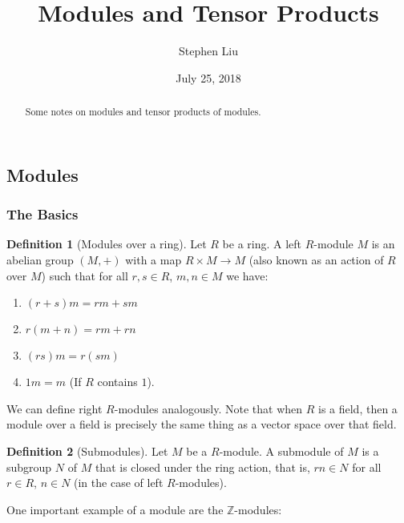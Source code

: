 \documentclass[11pt]{article}
\theoremstyle{definition}
\newtheorem*{defn}{Definition}
\theoremstyle{plain}
\theoremstyle{plain}
\theoremstyle{plain}
\theoremstyle{definition}
\begin{document}
\author{Stephen Liu}
\title{Modules and Tensor Products}
\date{July 25, 2018}

\maketitle

\begin{abstract}
Some notes on modules and tensor products of modules.
\end{abstract}

\subsection*{Modules}

\subsubsection*{The Basics}

\begin{defn}[Modules over a ring]
Let $R$ be a ring. A left $R$-module $M$ is an abelian group $(M, +)$ with a map $R \times M \to M$ (also known as an action of $R$ over $M$) such that for all $r, s \in R$, $m,n \in M$ we have:

\begin{enumerate}
\item $(r + s)m = rm + sm$
\item $r(m + n) = rm + rn$
\item $(rs)m = r(sm)$
\item $1m = m$ (If $R$ contains $1$).
\end{enumerate}
\end{defn}

We can define right $R$-modules analogously. Note that when $R$ is a field, then a module over a field is precisely the same thing as a vector space over that field.

\begin{defn}[Submodules]
Let $M$ be a $R$-module. A submodule of $M$ is a subgroup $N$ of $M$ that is closed under the ring action, that is, $rn \in N$ for all $r \in R$, $n \in N$ (in the case of left $R$-modules).
\end{defn}

One important example of a module are the $\mathbb{Z}$-modules:
\end{document}
